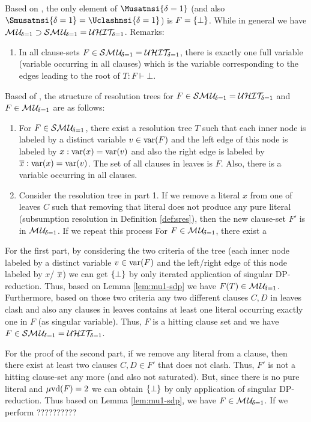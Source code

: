 \documentclass{report}
\begin{document}
\begin{lem}\label{lem:mu1-sma-uhit}
Based on \cite{h9}, the only element of $\Musatnsi{\delta=1}$ (and also $\Smusatnsi{\delta=1} = \Uclashnsi{\delta=1}$) is $F=\{ \bot \}$. While in general we have $\mathcal{M\hspace{0.8pt}U}_{\!\delta=1} \supset \mathcal{S}\mathcal{M\hspace{0.8pt}U}_{\!\delta=1} = \mathcal{U}\mathcal{HIT}_{\!\!\delta=1}$.
Remarks:
  \begin{enumerate}
  \item In all clause-sets $F \in \mathcal{S}\mathcal{M\hspace{0.8pt}U}_{\!\delta=1} = \mathcal{U}\mathcal{HIT}_{\!\!\delta=1}$, there is exactly one full variable (variable occurring in all clauses) which is the variable corresponding to the edges leading to the root of $T:F \vdash \bot$.
  \end{enumerate} 
\end{lem}
\begin{lem}\label{lem:mu1-build}
Based of \cite{h26}, the structure of resolution trees  for $F \in \mathcal{S}\mathcal{M\hspace{0.8pt}U}_{\!\delta=1}=\mathcal{U}\mathcal{HIT}_{\!\!\delta=1} $ and  $F \in \mathcal{M\hspace{0.8pt}U}_{\!\delta=1}$ are as follows:
  \begin{enumerate}
  \item For $F \in \mathcal{S}\mathcal{M\hspace{0.8pt}U}_{\!\delta=1}$, there exist a resolution tree $T$ such that each inner node is labeled by a distinct variable $v \in \operatorname{var}(F)$ and the left edge of this node is labeled by $x: \operatorname{var}(x)=\operatorname{var}(v)$ and also the right edge is labeled by $\overline x: \operatorname{var}(x)=\operatorname{var}(v)$. The set of all clauses in leaves is $F$. Also, there is a variable occurring in all clauses. 
  \item Consider the resolution tree in part 1. If we remove a literal $x$ from one of leaves $C$ such that removing that literal does not produce any pure literal (subsumption resolution in Definition \ref{def:sres}), then the new clause-set $F'$ is in $ \mathcal{M\hspace{0.8pt}U}_{\!\delta=1}$. If we repeat this process
  For $F \in \mathcal{M\hspace{0.8pt}U}_{\!\delta=1}$, there exist a 
  \end{enumerate}
\end{lem}
\begin{prf}
For the first part, by considering the two criteria of the tree (each inner node labeled by a distinct variable $v \in \operatorname{var}(F)$ and the left/right edge of this node labeled by $x$/ $\overline x$) we can get $\{ \bot \}$ by only iterated application of singular DP-reduction. Thus, based on Lemma \ref{lem:mu1-sdp} we have $F(T) \in  \mathcal{M\hspace{0.8pt}U}_{\!\delta=1}$. Furthermore, based on those two criteria any two different clauses $C,D$ in leaves clash and also any clauses in leaves contains at least one literal occurring exactly one in $F$ (as singular variable). Thus, $F$ is a hitting clause set and we have $F \in \mathcal{S}\mathcal{M\hspace{0.8pt}U}_{\!\delta=1}=\mathcal{U}\mathcal{HIT}_{\!\!\delta=1} $.

For the proof of the second part, if we remove any literal from a clause, then there exist at least two clauses $C,D \in F'$ that does not clash. Thus, $F'$ is not a hitting clause-set any more (and also not saturated). But, since there is no pure literal and $\operatorname{\mu\!\operatorname{vd}}(F) = 2$ we can obtain $\{ \bot \}$ by only application of singular DP-reduction. Thus based on Lemma \ref{lem:mu1-sdp}, we have $F \in \mathcal{M\hspace{0.8pt}U}_{\!\delta=1}$. If we perform ??????????
\end{prf}
\end{document}
